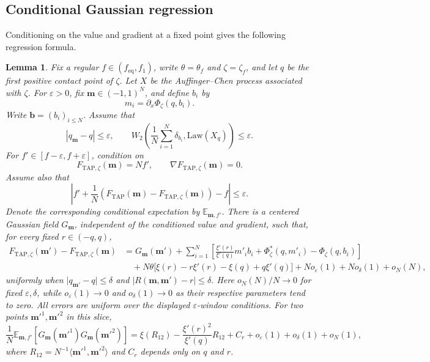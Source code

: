 \documentclass[a4paper,10pt,reqno]{amsart}
\numberwithin{equation}{section}
\newtheorem{lemma}[proposition]{Lemma}%
\newcommand{\ve}{\varepsilon}
\newcommand{\dE}{\mathbb{E}}%
\newcommand{\Law}{\mathrm{Law}}
\newcommand{\TAP}{\mathrm{TAP}}
\newcommand{\eq}{\mathrm{eq}}
\newcommand{\bfm}{\mathbf{m}}
\newcommand{\bfb}{\mathbf{b}}
\begin{document}
	\subsection{Conditional Gaussian regression}
	
	Conditioning on the value and gradient at a fixed point gives the following
	regression formula.
	
	\begin{lemma}\label{lem:reduced-same-shell-increment}
		Fix a regular \(f\in(f_{\eq},f_1)\), write
		\(\theta=\theta_f\) and \(\zeta=\zeta_f\), and let \(q\) be the first
		positive contact point of \(\zeta\). Let \(X\) be the
		Auffinger--Chen process associated with \(\zeta\). For
		\(\ve>0\), fix \(\bfm\in(-1,1)^N\), and define \(b_i\) by
		\[
		m_i=\partial_x\Phi_\zeta(q,b_i).
		\]
		Write \(\bfb=(b_i)_{i\le N}\).
		Assume that
		\[
		|q_\bfm-q|\le\ve,
		\qquad
		W_2\left(
		\frac1N\sum_{i=1}^N\delta_{b_i},
		\Law(X_q)
		\right)\le\ve.
		\]
		For \(f'\in[f-\ve,f+\ve]\), condition on
		\[
		F_{\TAP,\zeta}(\bfm)=Nf',
		\qquad
		\nabla F_{\TAP,\zeta}(\bfm)=0.
		\]
		Assume also that
		\[
		\left|
		f'
		+\frac1N\left(
		F_{\TAP}(\bfm)-F_{\TAP,\zeta}(\bfm)
		\right)
		-f
		\right|
		\le\ve.
		\]
		Denote the corresponding conditional expectation by
		\(\dE_{\bfm,f'}\).
		There is a centered Gaussian field \(G_\bfm\), independent of the
		conditioned value and gradient, such that, for every fixed
		\(r\in(-q,q)\),
		\begin{equation}\label{eq:ising-reduced-sibling-increment}
			\begin{aligned}
				F_{\TAP,\zeta}(\bfm')-F_{\TAP,\zeta}(\bfm)
				&=G_\bfm(\bfm')
				+\sum_{i=1}^N\left[
				\frac{\xi'(r)}{\xi'(q)}m'_i b_i
				+\Phi_\zeta^*(q,m'_i)-\Phi_\zeta(q,b_i)
				\right]\\
				&\quad+N\theta\bigl[\xi(r)-r\xi'(r)-\xi(q)+q\xi'(q)\bigr]
				+N o_\ve(1)+N o_\delta(1)+o_N(N),
			\end{aligned}
		\end{equation}
		uniformly when \(\lvert q_{\bfm'}-q\rvert\le\delta\) and
		\(\lvert R(\bfm,\bfm')-r\rvert\le\delta\). Here
		\(o_N(N)/N\to0\) for fixed \(\ve,\delta\), while
		\(o_\ve(1)\to0\) and \(o_\delta(1)\to0\) as their respective
		parameters tend to zero. All errors are uniform over the displayed
		\(\ve\)-window conditions. For two points
		\(\bfm'^1,\bfm'^2\) in this slice,
		\[
		\frac1N\dE_{\bfm,f'}\left[
		G_\bfm(\bfm'^1)G_\bfm(\bfm'^2)
		\right]
		=
		\xi(R_{12})-
		\frac{\xi'(r)^2}{\xi'(q)}R_{12}+C_r
		+o_\ve(1)+o_\delta(1)+o_N(1),
		\]
		where \(R_{12}=N^{-1}\langle\bfm'^1,\bfm'^2\rangle\) and \(C_r\) depends
		only on \(q\) and \(r\).
	\end{lemma}
	
\end{document}
